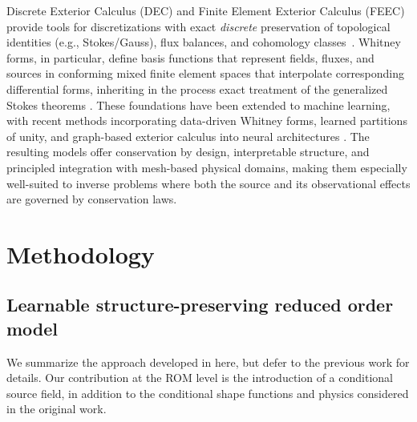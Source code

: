 \documentclass[onefignum,onetabnum]{siamart171218} %
\begin{document}
Discrete Exterior Calculus (DEC) and Finite Element Exterior Calculus (FEEC) provide tools for discretizations with exact \emph{discrete} preservation of topological identities (e.g., Stokes/Gauss), flux balances, and cohomology classes~\cite{arnold2018finite, desbrun2005discrete}. Whitney forms, in particular, define basis functions that represent fields, fluxes, and sources in conforming mixed finite element spaces that interpolate corresponding differential forms, inheriting in the process exact treatment of the generalized Stokes theorems \cite{lohi2021whitney}.
These foundations have been extended to machine learning, with recent methods incorporating data-driven Whitney forms, learned partitions of unity, and graph-based exterior calculus into neural architectures \cite{trask2022enforcing, actor2024data, jiang2024structure}. The resulting models offer conservation by design, interpretable structure, and principled integration with mesh-based physical domains, making them especially well-suited to inverse problems where both the source and its observational effects are governed by conservation laws.


\section{Methodology}
\label{sec:methodology}


\subsection{Learnable structure-preserving reduced order model}
\label{sec:methodology_pde_surrogate}

We summarize the approach developed in \cite{kinch2025structure} here, but defer to the previous work for details. Our contribution at the ROM level is the introduction of a conditional source field, in addition to the conditional shape functions and physics considered in the original work.
\end{document}

